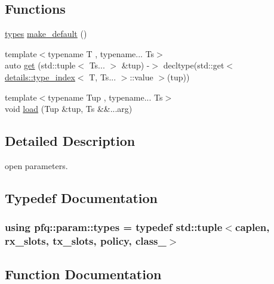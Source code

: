 \subsection*{Functions}
\begin{DoxyCompactItemize}
\item 
\hyperlink{namespacepfq_1_1param_a287394f9fea16ebb76e770334aedd2d5}{types} \hyperlink{namespacepfq_1_1param_af1fd1aeb980688527db587b35f55abf2}{make\+\_\+default} ()
\item 
{\footnotesize template$<$typename T , typename... Ts$>$ }\\auto \hyperlink{namespacepfq_1_1param_a26825d94a20bcf1cc8353307ea00f5b7}{get} (std\+::tuple$<$ Ts... $>$ \&tup) -\/$>$ decltype(std\+::get$<$ \hyperlink{structpfq_1_1param_1_1details_1_1type__index}{details\+::type\+\_\+index}$<$ T, Ts... $>$\+::value $>$(tup))
\item 
{\footnotesize template$<$typename Tup , typename... Ts$>$ }\\void \hyperlink{namespacepfq_1_1param_aeabbdcec021e01a0a9321678fea99d8f}{load} (Tup \&tup, Ts \&\&...arg)
\end{DoxyCompactItemize}


\subsection{Detailed Description}
open parameters. 

\subsection{Typedef Documentation}
\subsubsection[{\texorpdfstring{types}{types}}]{\setlength{\rightskip}{0pt plus 5cm}using {\bf pfq\+::param\+::types} = typedef std\+::tuple$<${\bf caplen}, {\bf rx\+\_\+slots}, {\bf tx\+\_\+slots}, {\bf policy}, {\bf class\+\_\+}$>$}\hypertarget{namespacepfq_1_1param_a287394f9fea16ebb76e770334aedd2d5}{}\label{namespacepfq_1_1param_a287394f9fea16ebb76e770334aedd2d5}


\subsection{Function Documentation}

